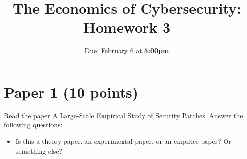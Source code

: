 \documentclass[11pt]{article}
\title{The Economics of Cybersecurity: Homework 3}
\date{Due: February 6 at {\bf 5:00pm}}
\author{}
\begin{document}
\maketitle


\section*{Paper 1 (10 points)}

Read the paper \href{https://dl.acm.org/doi/abs/10.1145/3133956.3134072}{A Large-Scale Empirical Study of Security Patches}. Answer the following questions:
\begin{itemize}
    \item Is this a theory paper, an experimental paper, or an empirics paper? Or something else? 
\end{itemize}
\end{document}
